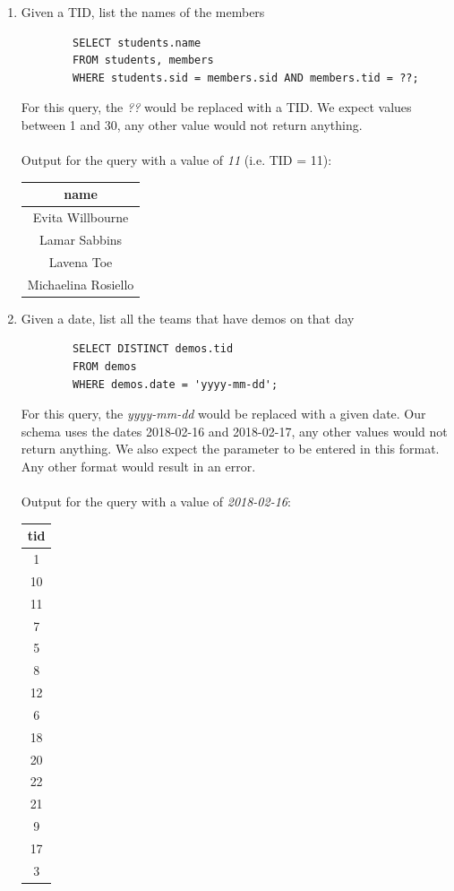 \documentclass[11pt,letterpaper]{article}
\begin{document}
\begin{enumerate}
				\pagebreak
		
		\item Given a TID, list the names of the members
		
		\begin{verbatim}
		SELECT students.name 
		FROM students, members 
		WHERE students.sid = members.sid AND members.tid = ??;
		\end{verbatim}
		For this query, the \textit{??} would be replaced with a TID. We expect values between 1 and 30, any other value would not return anything.\\
		\\
		Output for the query with a value of \textit{11} (i.e. TID = 11):
		\begin{center}
			\begin{tabular}{ | c | }
				\hline
				name \\
				\hline
				Evita Willbourne \\
				Lamar Sabbins \\
				Lavena Toe \\
				Michaelina Rosiello \\
				\hline
			\end{tabular}
		\end{center}
		
		\item Given a date, list all the teams that have demos on that day
		
		\begin{verbatim}
		SELECT DISTINCT demos.tid 
		FROM demos 
		WHERE demos.date = 'yyyy-mm-dd';
		\end{verbatim}
		For this query, the \textit{yyyy-mm-dd} would be replaced with a given date. Our schema uses the dates 2018-02-16 and 2018-02-17, any other values would not return anything. We also expect the parameter to be entered in this format. Any other format would result in an error.\\
		\\
		Output for the query with a value of \textit{2018-02-16}:
		\begin{center}
			\begin{tabular}{ | c | }
				\hline
				tid \\
				\hline
				1 \\
				10 \\
				11 \\
				7 \\
				5 \\
				8 \\
				12 \\
				6 \\
				18 \\
				20 \\
				22 \\
				21 \\
				9 \\
				17 \\
				3 \\
				\hline
			\end{tabular}
		\end{center}
		

\end{enumerate}
\end{document}
